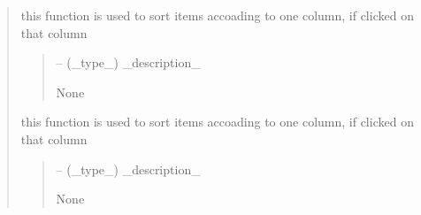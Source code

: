 \documentclass[letterpaper,10pt,english]{sphinxmanual}
\begin{document}
\begin{quote}
\begin{savenotes}
\begin{fulllineitems}
\begin{savenotes}
\begin{fulllineitems}
\end{fulllineitems}\end{savenotes}


\begin{savenotes}\begin{fulllineitems}
\label{\detokenize{setting/setting_api:oxin.setting_api.API.tabledefectgroups_onHeaderClicked}}
\pysigstartsignatures
{}
\pysigstopsignatures
\sphinxAtStartPar
this function is used to sort items accoading to one column, if clicked on that column
\begin{quote}\begin{description}
\sphinxAtStartPar
{} – (\_type\_) \_description\_

\sphinxAtStartPar
None

\end{description}\end{quote}

\end{fulllineitems}\end{savenotes}


\begin{savenotes}\begin{fulllineitems}
\label{\detokenize{setting/setting_api:oxin.setting_api.API.tabledefects_onHeaderClicked}}
\pysigstartsignatures
{}
\pysigstopsignatures
\sphinxAtStartPar
this function is used to sort items accoading to one column, if clicked on that column
\begin{quote}\begin{description}
\sphinxAtStartPar
{} – (\_type\_) \_description\_

\sphinxAtStartPar
None


\end{description}
\end{quote}
\end{fulllineitems}
\end{savenotes}
\end{fulllineitems}
\end{savenotes}
\end{quote}
\end{document}
